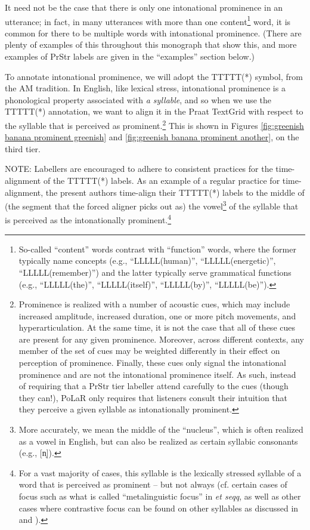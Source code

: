\documentclass[11pt, twoside]{memoir}
\begin{document}
It need not be the case that there is only one intonational prominence in an utterance; in fact, in many utterances with more than one content\footnote{So-called “content” words contrast with “function” words, where the former typically name concepts (e.g., “LLLLL(human)”, “LLLLL(energetic)”, “LLLLL(remember)”) and the latter typically serve grammatical functions (e.g., “LLLLL(the)”, “LLLLL(itself)”, “LLLLL(by)”, “LLLLL(be)”).} word, it is common for there to be multiple words with intonational prominence. (There are plenty of examples of this throughout this monograph that show this, and more examples of PrStr labels are given in the “examples” section below.)

To annotate intonational prominence, we will adopt the TTTTT(*) symbol, from the AM tradition. In English, like lexical stress, intonational prominence is a phonological property associated with \textit{a syllable}, and so when we use the TTTTT(*) annotation, we want to align it in the Praat TextGrid with respect to the syllable that is perceived as prominent.\footnote{Prominence is realized with a number of acoustic cues, which may include increased amplitude, increased duration, one or more pitch movements, and hyperarticulation. At the same time, it is not the case that all of these cues are present for any given prominence. Moreover, across different contexts, any member of the set of cues may be weighted differently in their effect on perception of prominence. Finally, these cues only signal the intonational prominence and are not the intonational prominence itself. As such, instead of requiring that a PrStr tier labeller attend carefully to the cues (though they can!), PoLaR only requires that listeners consult their intuition that they perceive a given syllable as intonationally prominent.\label{fn:prominence cues}} This is shown in Figures \ref{fig:greenish banana prominent greenish} and \ref{fig:greenish banana prominent another}, on the third tier.

NOTE: Labellers are encouraged to adhere to consistent practices for the time-alignment of the TTTTT(*) labels. As an example of a regular practice for time-alignment, the present authors time-align their TTTTT(*) labels to the middle of (the segment that the forced aligner picks out as) the vowel\footnote{More accurately, we mean the middle of the “nucleus”, which is often realized as a vowel in English, but can also be realized as certain syllabic consonants (e.g., [n̩]).} of the syllable that is perceived as the intonationally prominent.\footnote{For a vast majority of cases, this syllable is the lexically stressed syllable of a word that is perceived as prominent – but not always (cf. certain cases of focus such as what is called “metalinguistic focus” in \citealt{erteschik-shir99} \textit{et seqq}, as well as other cases where contrastive focus can be found on other syllables as discussed in \citealt{armstrongschwenter16} and \citealt{ahn-21a}).}
\end{document}
